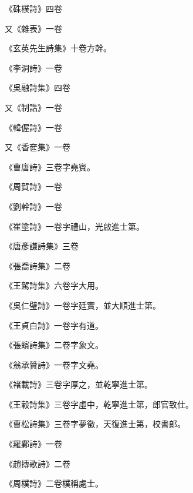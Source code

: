 \begin{pinyinscope}
 《硃樸詩》四卷



 又《雜表》一卷



 《玄英先生詩集》十卷方幹。



 《李洞詩》一卷



 《吳融詩集》四卷



 又《制誥》一卷



 《韓偓詩》一卷



 又《香奩集》一卷



 《曹唐詩》三卷字堯賓。



 《周賀詩》一卷



 《劉幹詩》一卷



 《崔塗詩》一卷字禮山，光啟進士第。



 《唐彥謙詩集》三卷



 《張喬詩集》二卷



 《王駕詩集》六卷字大用。



 《吳仁璧詩》一卷字廷實，並大順進士第。



 《王貞白詩》一卷字有道。



 《張蠙詩集》二卷字象文。



 《翁承贊詩》一卷字文堯。



 《褚載詩》三卷字厚之，並乾寧進士第。



 《王轂詩集》三卷字虛中，乾寧進士第，郎官致仕。



 《曹松詩集》三卷字夢徵，天復進士第，校書郎。



 《羅鄴詩》一卷



 《趙摶歌詩》二卷



 《周樸詩》二卷樸稱處士。




\end{pinyinscope}
